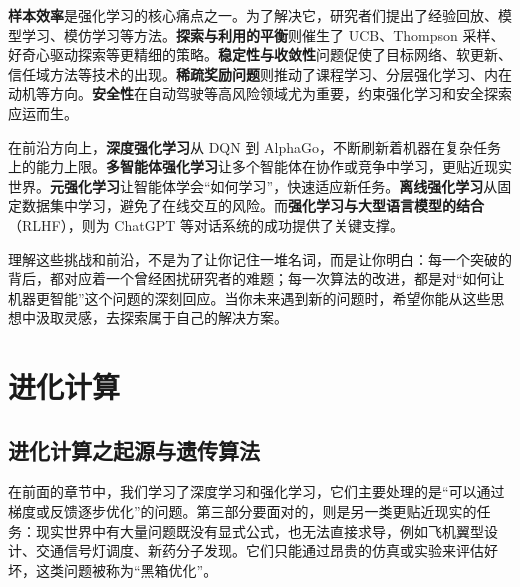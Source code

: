 \documentclass[lang=cn,zihao=-4,a4paper,fontset=windows]{beautybook}
\begin{document}
\textbf{样本效率}是强化学习的核心痛点之一。为了解决它，研究者们提出了经验回放、模型学习、模仿学习等方法。\textbf{探索与利用的平衡}则催生了 UCB、Thompson 采样、好奇心驱动探索等更精细的策略。\textbf{稳定性与收敛性}问题促使了目标网络、软更新、信任域方法等技术的出现。\textbf{稀疏奖励问题}则推动了课程学习、分层强化学习、内在动机等方向。\textbf{安全性}在自动驾驶等高风险领域尤为重要，约束强化学习和安全探索应运而生。

在前沿方向上，\textbf{深度强化学习}从 DQN 到 AlphaGo，不断刷新着机器在复杂任务上的能力上限。\textbf{多智能体强化学习}让多个智能体在协作或竞争中学习，更贴近现实世界。\textbf{元强化学习}让智能体学会“如何学习”，快速适应新任务。\textbf{离线强化学习}从固定数据集中学习，避免了在线交互的风险。而\textbf{强化学习与大型语言模型的结合}（RLHF），则为 ChatGPT 等对话系统的成功提供了关键支撑。

理解这些挑战和前沿，不是为了让你记住一堆名词，而是让你明白：每一个突破的背后，都对应着一个曾经困扰研究者的难题；每一次算法的改进，都是对“如何让机器更智能”这个问题的深刻回应。当你未来遇到新的问题时，希望你能从这些思想中汲取灵感，去探索属于自己的解决方案。

\part{进化计算}

\chapter{进化计算之起源与遗传算法}

在前面的章节中，我们学习了深度学习和强化学习，它们主要处理的是“可以通过梯度或反馈逐步优化”的问题。第三部分要面对的，则是另一类更贴近现实的任务：现实世界中有大量问题既没有显式公式，也无法直接求导，例如飞机翼型设计、交通信号灯调度、新药分子发现。它们只能通过昂贵的仿真或实验来评估好坏，这类问题被称为“黑箱优化”。
\end{document}
